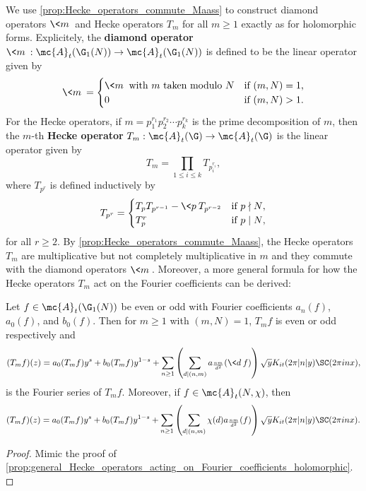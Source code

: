     We use \cref{prop:Hecke_operators_commute_Maass} to construct diamond operators $\<m\>$ and Hecke operators $T_{m}$ for all $m \ge 1$ exactly as for holomorphic forms. Explicitely, the \textbf{diamond operator} $\<m\>:\mc{A}_{t}(\G_{1}(N)) \to \mc{A}_{t}(\G_{1}(N))$ is defined to be the linear operator given by
    \[
      \<m\> = \begin{cases} \<m\> \text{ with $m$ taken modulo $N$} & \text{if $(m,N) = 1$,} \\ 0 & \text{if $(m,N) > 1$.} \end{cases}
    \]
    For the Hecke operators, if $m = p_{1}^{r_{1}}p_{2}^{r_{2}} \cdots p_{k}^{r_{k}}$ is the prime decomposition of $m$, then the $m$-th \textbf{Hecke operator} $T_{m}:\mc{A}_{t}(\G) \to \mc{A}_{t}(\G)$ is the linear operator given by
    \[
      T_{m} = \prod_{1 \le i \le k}T_{p_{i}^{r_{i}}},
    \]
    where $T_{p^{r}}$ is defined inductively by
    \[
      T_{p^{r}} = \begin{cases} T_{p}T_{p^{r-1}}-\<p\>T_{p^{r-2}} & \text{if $p \nmid N$}, \\ T_{p}^{r} & \text{if $p \mid N$}, \end{cases}
    \]
    for all $r \ge 2$. By \cref{prop:Hecke_operators_commute_Maass}, the Hecke operators $T_{m}$ are multiplicative but not completely multiplicative in $m$ and they commute with the diamond operators $\<m\>$. Moreover, a more general formula for how the Hecke operators $T_{m}$ act on the Fourier coefficients can be derived:

    \begin{proposition}\label{prop:general_Hecke_operators_acting_on_Fourier_coefficients_Maass}
      Let $f \in \mc{A}_{t}(\G_{1}(N))$ be even or odd with Fourier coefficients $a_{n}(f)$, $a_{0}(f)$, and $b_{0}(f)$. Then for $m \ge 1$ with $(m,N) = 1$, $T_{m}f$ is even or odd respectively and
      \[
        (T_{m}f)(z) = a_{0}(T_{m}f)y^{s}+b_{0}(T_{m}f)y^{1-s}+\sum_{n \ge 1}\left(\sum_{d \mid (n,m)}a_{\frac{nm}{d^{2}}}(\<d\>f)\right)\sqrt{y}K_{it}(2\pi|n|y)\SC(2\pi inx),
      \]
      is the Fourier series of $T_{m}f$. Moreover, if $f \in \mc{A}_{t}(N,\chi)$, then
      \[
        (T_{m}f)(z) = a_{0}(T_{m}f)y^{s}+b_{0}(T_{m}f)y^{1-s}+\sum_{n \ge 1}\left(\sum_{d \mid (n,m)}\chi(d)a_{\frac{nm}{d^{2}}}(f)\right)\sqrt{y}K_{it}(2\pi|n|y)\SC(2\pi inx).
      \]
    \end{proposition}
    \begin{proof}
      Mimic the proof of \cref{prop:general_Hecke_operators_acting_on_Fourier_coefficients_holomorphic}.
    \end{proof}


